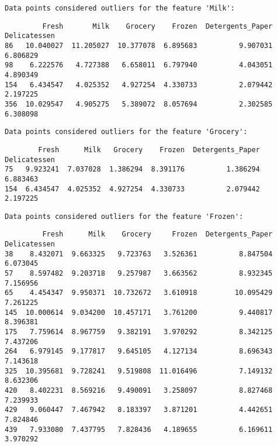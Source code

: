 \documentclass[11pt]{article}
\begin{document}
    
    \begin{Verbatim}[commandchars=\\\{\}]
Data points considered outliers for the feature 'Milk':

    \end{Verbatim}

    
    \begin{verbatim}
         Fresh       Milk    Grocery    Frozen  Detergents_Paper  Delicatessen
86   10.040027  11.205027  10.377078  6.895683          9.907031      6.806829
98    6.222576   4.727388   6.658011  6.797940          4.043051      4.890349
154   6.434547   4.025352   4.927254  4.330733          2.079442      2.197225
356  10.029547   4.905275   5.389072  8.057694          2.302585      6.308098
    \end{verbatim}

    
    \begin{Verbatim}[commandchars=\\\{\}]
Data points considered outliers for the feature 'Grocery':

    \end{Verbatim}

    
    \begin{verbatim}
        Fresh      Milk   Grocery    Frozen  Detergents_Paper  Delicatessen
75   9.923241  7.037028  1.386294  8.391176          1.386294      6.883463
154  6.434547  4.025352  4.927254  4.330733          2.079442      2.197225
    \end{verbatim}

    
    \begin{Verbatim}[commandchars=\\\{\}]
Data points considered outliers for the feature 'Frozen':

    \end{Verbatim}

    
    \begin{verbatim}
         Fresh      Milk    Grocery     Frozen  Detergents_Paper  Delicatessen
38    8.432071  9.663325   9.723763   3.526361          8.847504      6.073045
57    8.597482  9.203718   9.257987   3.663562          8.932345      7.156956
65    4.454347  9.950371  10.732672   3.610918         10.095429      7.261225
145  10.000614  9.034200  10.457171   3.761200          9.440817      8.396381
175   7.759614  8.967759   9.382191   3.970292          8.342125      7.437206
264   6.979145  9.177817   9.645105   4.127134          8.696343      7.143618
325  10.395681  9.728241   9.519808  11.016496          7.149132      8.632306
420   8.402231  8.569216   9.490091   3.258097          8.827468      7.239933
429   9.060447  7.467942   8.183397   3.871201          4.442651      7.824846
439   7.933080  7.437795   7.828436   4.189655          6.169611      3.970292
    \end{verbatim}
\end{document}
